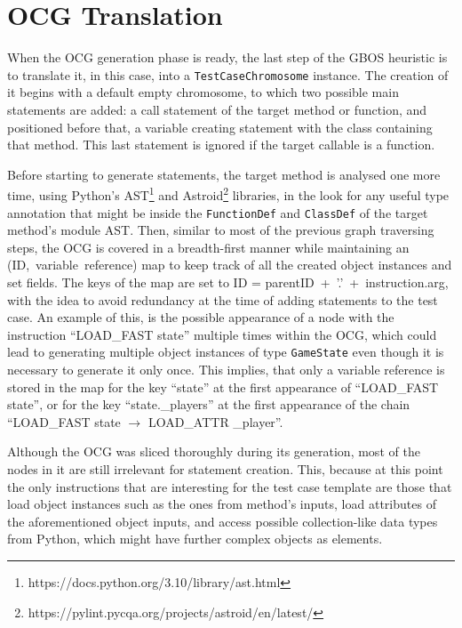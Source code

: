 \documentclass[%
  chapterprefix=false,%
  open=right,%
  twoside=true,%
  paper=a4,%
  logofile={Figures/logo.png},%
  thesistype=master,%
  UKenglish,%
]{se2thesis}
\newcommand{\classname}[1]{\texttt{#1}}
\begin{document}
\section{OCG Translation}

When the OCG generation phase is ready, the last step of the GBOS heuristic is to translate it, in this case, into a \classname{TestCaseChromosome} instance.
The creation of it begins with a default empty chromosome, to which two possible main statements are added: a call statement of the target method or function, and positioned before that, a variable creating statement with the class containing that method.
This last statement is ignored if the target callable is a function.

Before starting to generate statements, the target method is analysed one more time, using Python's AST\footnote{https://docs.python.org/3.10/library/ast.html} and Astroid\footnote{https://pylint.pycqa.org/projects/astroid/en/latest/} libraries, in the look for any useful type annotation that might be inside the \classname{FunctionDef} and \classname{ClassDef} of the target method's module AST.\@ 
Then, similar to most of the previous graph traversing steps, the OCG is covered in a breadth-first manner while maintaining an (ID,~variable~reference) map to keep track of all the created object instances and set fields.
The keys of the map are set to ID = parentID~+~'.'~+~instruction.arg, with the idea  to avoid redundancy at the time of adding statements to the test case.
An example of this, is the possible appearance of a node with the instruction ``LOAD\_FAST state'' multiple times within the OCG, which could lead to generating multiple object instances of type \classname{GameState} even though it is necessary to generate it only once.
This implies, that only a variable reference is stored in the map for the key ``state'' at the first appearance of ``LOAD\_FAST state'', or for the key ``state.\_players'' at the first appearance of the chain ``LOAD\_FAST state \(\rightarrow\) LOAD\_ATTR \_player''.

Although the OCG was sliced thoroughly during its generation, most  of the nodes in it are still irrelevant for statement creation.
This, because at this point the only instructions that are interesting for the test case template are those that load object instances such as the ones from method's inputs, load attributes of the aforementioned object inputs, and access possible collection-like data types from Python, which might have further complex objects as elements.
\end{document}
